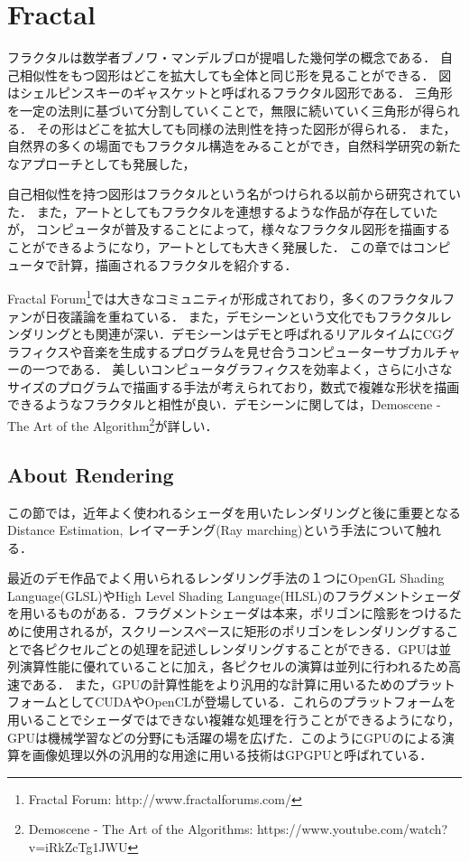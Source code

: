 \section{Fractal}

フラクタルは数学者ブノワ・マンデルブロが提唱した幾何学の概念である．
自己相似性をもつ図形はどこを拡大しても全体と同じ形を見ることができる．
図はシェルピンスキーのギャスケットと呼ばれるフラクタル図形である．
三角形を一定の法則に基づいて分割していくことで，無限に続いていく三角形が得られる．
その形はどこを拡大しても同様の法則性を持った図形が得られる．
また，自然界の多くの場面でもフラクタル構造をみることができ，自然科学研究の新たなアプローチとしても発展した，

自己相似性を持つ図形はフラクタルという名がつけられる以前から研究されていた．
また，アートとしてもフラクタルを連想するような作品が存在していたが，
コンピュータが普及することによって，様々なフラクタル図形を描画することができるようになり，アートとしても大きく発展した．
この章ではコンピュータで計算，描画されるフラクタルを紹介する．

Fractal Forum\footnote{Fractal Forum:  http://www.fractalforums.com/}では大きなコミュニティが形成されており，多くのフラクタルファンが日夜議論を重ねている．
また，デモシーンという文化でもフラクタルレンダリングとも関連が深い．デモシーンはデモと呼ばれるリアルタイムにCGグラフィクスや音楽を生成するプログラムを見せ合うコンピューターサブカルチャーの一つである．
美しいコンピュータグラフィクスを効率よく，さらに小さなサイズのプログラムで描画する手法が考えられており，数式で複雑な形状を描画できるようなフラクタルと相性が良い．デモシーンに関しては，Demoscene - The Art of the Algorithm\footnote{Demoscene - The Art of the Algorithms: https://www.youtube.com/watch?v=iRkZcTg1JWU}が詳しい．

\subsection{About Rendering}

この節では，近年よく使われるシェーダを用いたレンダリングと後に重要となるDistance Estimation, レイマーチング(Ray marching)という手法について触れる．

最近のデモ作品でよく用いられるレンダリング手法の１つにOpenGL Shading Language(GLSL)やHigh Level Shading Language(HLSL)のフラグメントシェーダを用いるものがある．フラグメントシェーダは本来，ポリゴンに陰影をつけるために使用されるが，スクリーンスペースに矩形のポリゴンをレンダリングすることで各ピクセルごとの処理を記述しレンダリングすることができる．GPUは並列演算性能に優れていることに加え，各ピクセルの演算は並列に行われるため高速である．
また，GPUの計算性能をより汎用的な計算に用いるためのプラットフォームとしてCUDAやOpenCLが登場している．これらのプラットフォームを用いることでシェーダではできない複雑な処理を行うことができるようになり，GPUは機械学習などの分野にも活躍の場を広げた．このようにGPUのによる演算を画像処理以外の汎用的な用途に用いる技術はGPGPUと呼ばれている．

